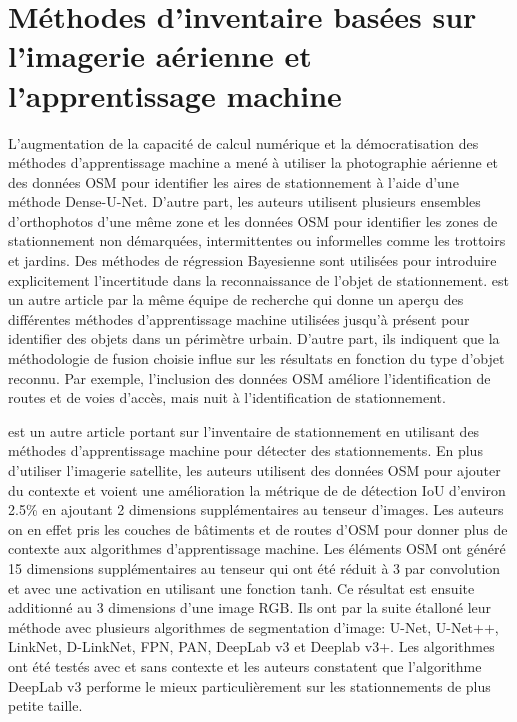 \section{Méthodes d'inventaire basées sur l'imagerie aérienne et l'apprentissage machine}
  L'augmentation de la capacité de calcul numérique et la démocratisation des méthodes d'apprentissage machine a mené \textcite{hellekes_parking_2023} à utiliser la photographie aérienne et des données \ac{OSM} pour identifier les aires de stationnement à l'aide d'une méthode Dense-U-Net. D'autre part, les auteurs utilisent plusieurs ensembles d'orthophotos d'une même zone et les données \ac{OSM} pour identifier les zones de stationnement non démarquées, intermittentes ou informelles comme les trottoirs et jardins. Des méthodes de régression Bayesienne sont utilisées pour introduire explicitement l'incertitude dans la reconnaissance de l'objet de stationnement. \textcite{henry_citywide_2021} est un autre article par la même équipe de recherche qui donne un aperçu des différentes méthodes d'apprentissage machine utilisées jusqu'à présent pour identifier des objets dans un périmètre urbain. D'autre part, ils indiquent que la méthodologie de fusion choisie influe sur les résultats en fonction du type d'objet reconnu. Par exemple, l'inclusion des données \ac{OSM} améliore l'identification de routes et de voies d'accès, mais nuit à l'identification de stationnement.  \par
  \textcite{yin_context-enriched_2022} est un autre article portant sur l'inventaire de stationnement en utilisant des méthodes d'apprentissage machine pour détecter des stationnements. En plus d'utiliser l'imagerie satellite, les auteurs utilisent des données \ac{OSM} pour ajouter du contexte et voient une amélioration la métrique de de détection \ac{IoU} d'environ 2.5\% en ajoutant 2 dimensions supplémentaires au tenseur d'images. Les auteurs on en effet pris les couches de bâtiments et de routes d'\ac{OSM} pour donner plus de contexte aux algorithmes d'apprentissage machine. Les éléments \ac{OSM} ont généré 15 dimensions supplémentaires au tenseur qui ont été réduit à 3 par convolution et avec une activation en utilisant une fonction tanh. Ce résultat est ensuite additionné au 3 dimensions d'une image RGB. Ils ont par la suite étalloné leur méthode avec plusieurs algorithmes de segmentation d'image: U-Net, U-Net++, LinkNet, D-LinkNet, FPN, PAN, DeepLab v3 et Deeplab v3+. Les algorithmes ont été testés avec et sans contexte et les auteurs constatent que l'algorithme DeepLab v3 performe le mieux particulièrement sur les stationnements de plus petite taille.